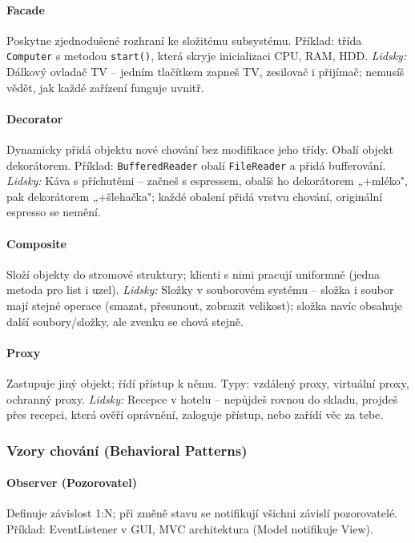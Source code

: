 \paragraph{Facade}
Poskytne zjednodušené rozhraní ke složitému subsystému.
Příklad: třída \texttt{Computer} s metodou \texttt{start()}, která skryje inicializaci CPU, RAM, HDD.
\textit{Lidsky:} Dálkový ovladač TV -- jedním tlačítkem zapneš TV, zesilovač i přijímač; nemusíš vědět, jak každé zařízení funguje uvnitř.

\paragraph{Decorator}
Dynamicky přidá objektu nové chování bez modifikace jeho třídy. Obalí objekt dekorátorem.
Příklad: \texttt{BufferedReader} obalí \texttt{FileReader} a přidá bufferování.
\textit{Lidsky:} Káva s příchutěmi -- začneš s espressem, obalíš ho dekorátorem „+mléko", pak dekorátorem „+šlehačka"; každé obalení přidá vrstvu chování, originální espresso se nemění.

\paragraph{Composite}
Složí objekty do stromové struktury; klienti s nimi pracují uniformně (jedna metoda pro list i uzel).
\textit{Lidsky:} Složky v souborovém systému -- složka i soubor mají stejné operace (smazat, přesunout, zobrazit velikost); složka navíc obsahuje další soubory/složky, ale zvenku se chová stejně.

\paragraph{Proxy}
Zastupuje jiný objekt; řídí přístup k němu. Typy: vzdálený proxy, virtuální proxy, ochranný proxy.
\textit{Lidsky:} Recepce v hotelu -- nepůjdeš rovnou do skladu, projdeš přes recepci, která ověří oprávnění, zaloguje přístup, nebo zařídí věc za tebe.

\subsubsection{Vzory chování (Behavioral Patterns)}

\paragraph{Observer (Pozorovatel)}
Definuje závislost 1:N; při změně stavu se notifikují všichni závislí pozorovatelé.
Příklad: EventListener v GUI, MVC architektura (Model notifikuje View).

